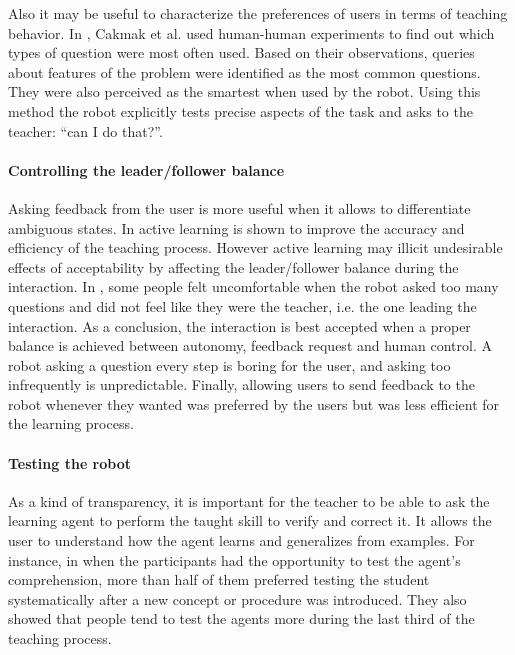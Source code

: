 Also it may be useful to characterize the preferences of users in terms of teaching behavior. In \cite{cakmak2012designing}, Cakmak et al. used human-human experiments to find out which types of question were most often used. Based on their observations, queries about features of the problem were identified as the most common questions. They were also perceived as the smartest when used by the robot. Using this method the robot explicitly tests precise aspects of the task and asks to the teacher: ``can I do that?''.

\paragraph{Controlling the leader/follower balance} Asking feedback from the user is more useful when it allows to differentiate ambiguous states. In \cite{chao2010transparent} active learning is shown to improve the accuracy and efficiency of the teaching process. However active learning may illicit undesirable effects of acceptability by affecting the leader/follower balance during the interaction. In \cite{chao2010transparent}, some people felt uncomfortable when the robot asked too many questions and did not feel like they were the teacher, i.e. the one leading the interaction. As a conclusion, the interaction is best accepted when a proper balance is achieved between autonomy, feedback request and human control. A robot asking a question every step is boring for the user, and asking too infrequently is unpredictable. Finally, allowing users to send feedback to the robot whenever they wanted was preferred by the users but was less efficient for the learning process.


\paragraph{Testing the robot} As a kind of transparency, it is important for the teacher to be able to ask the learning agent to perform the taught skill to verify and correct it. It allows the user to understand how the agent learns and generalizes from examples. For instance, in \cite{kaochar2011towards} when the participants had the opportunity to test the agent's comprehension, more than half of them preferred testing the student systematically after a new concept or procedure was introduced. They also showed that people tend to test the agents more during the last third of the teaching process.

